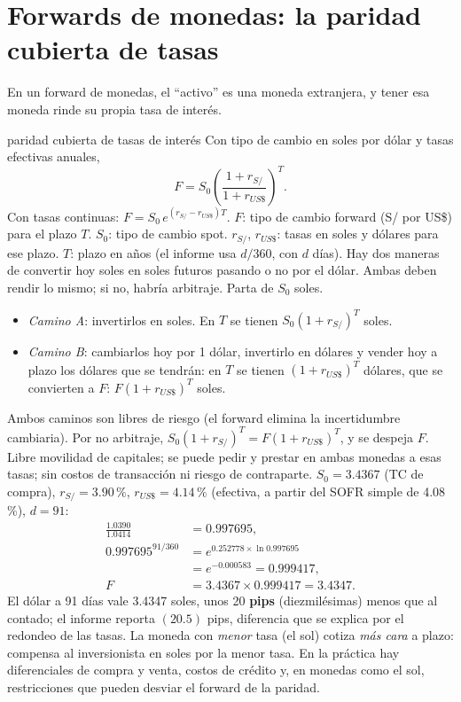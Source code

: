 \section{Forwards de monedas: la paridad cubierta de tasas}\label{sec:cip}

En un forward de monedas, el \enquote{activo} es una moneda extranjera, y tener esa moneda rinde su propia tasa de interés.

\begin{ficha}{paridad cubierta de tasas de interés}
 Con tipo de cambio en soles por dólar y tasas efectivas anuales,
\[ F=S_0\left(\frac{1+r_{S/}}{1+r_{US\$}}\right)^{T}. \]
Con tasas continuas: $F=S_0\,e^{(r_{S/}-r_{US\$})T}$.
 $F$: tipo de cambio forward (S/ por US\$) para el plazo $T$. $S_0$: tipo de cambio spot. $r_{S/}$, $r_{US\$}$: tasas en soles y dólares para ese plazo. $T$: plazo en años (el informe usa $d/360$, con $d$ días).
 Hay dos maneras de convertir hoy soles en soles futuros pasando o no por el dólar. Ambas deben rendir lo mismo; si no, habría arbitraje.
 Parta de $S_0$ soles.
\begin{itemize}
\item \emph{Camino A}: invertirlos en soles. En $T$ se tienen $S_0(1+r_{S/})^T$ soles.
\item \emph{Camino B}: cambiarlos hoy por 1 dólar, invertirlo en dólares y vender hoy a plazo los dólares que se tendrán: en $T$ se tienen $(1+r_{US\$})^T$ dólares, que se convierten a $F$: $F(1+r_{US\$})^T$ soles.
\end{itemize}
Ambos caminos son libres de riesgo (el forward elimina la incertidumbre cambiaria). Por no arbitraje, $S_0(1+r_{S/})^T=F(1+r_{US\$})^T$, y se despeja $F$.
 Libre movilidad de capitales; se puede pedir y prestar en ambas monedas a esas tasas; sin costos de transacción ni riesgo de contraparte.
 $S_0=3.4367$ (TC de compra), $r_{S/}=3.90\,\%$, $r_{US\$}=4.14\,\%$ (efectiva, a partir del SOFR simple de 4.08\,\%), $d=91$:
\begin{align*}
\frac{1.0390}{1.0414}&=0.997695,\\
0.997695^{91/360}&=e^{0.252778\times\ln 0.997695}\\&=e^{-0.000583}=0.999417,\\
F&=3.4367\times0.999417=3.4347.
\end{align*}
 El dólar a 91 días vale 3.4347 soles, unos 20 \textbf{pips} (diezmilésimas) menos que al contado; el informe reporta $(20.5)$ pips, diferencia que se explica por el redondeo de las tasas. La moneda con \emph{menor} tasa (el sol) cotiza \emph{más cara} a plazo: compensa al inversionista en soles por la menor tasa.
 En la práctica hay diferenciales de compra y venta, costos de crédito y, en monedas como el sol, restricciones que pueden desviar el forward de la paridad.
\end{ficha}

